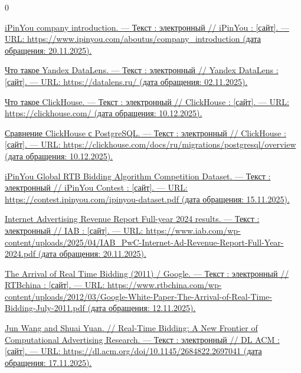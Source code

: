 \begin{thebibliography}{0}

\hypertarget{ipinyou}{}
\href{https://www.ipinyou.com/aboutus/company_introduction/}{iPinYou company introduction. — Текст : электронный // iPinYou : [сайт]. — URL: https://www.ipinyou.com/aboutus/company\_introduction (дата обращения: 20.11.2025).}

\hypertarget{datalens}{}
\href{https://datalens.ru/}{Что такое Yandex DataLens. — Текст : электронный // Yandex DataLens : [сайт]. — URL: https://datalens.ru/ (дата обращения: 02.11.2025).}

\hypertarget{clickhouse}{}
\href{https://clickhouse.com/}{Что такое ClickHouse. — Текст : электронный // ClickHouse : [сайт]. — URL: https://clickhouse.com/ (дата обращения: 10.12.2025).}

\hypertarget{clickhouse-vs-postgres}{}
\href{https://clickhouse.com/docs/ru/migrations/postgresql/overview}{Сравнение ClickHouse с PostgreSQL. — Текст : электронный // ClickHouse : [сайт]. — URL: https://clickhouse.com/docs/ru/migrations/postgresql/overview (дата обращения: 10.12.2025).}

\hypertarget{ipinyou-contest-database}{}
\href{https://contest.ipinyou.com/ipinyou-dataset.pdf}{iPinYou Global RTB Bidding Algorithm Competition Dataset. — Текст : электронный // iPinYou Contest : [сайт]. — URL: https://contest.ipinyou.com/ipinyou-dataset.pdf (дата обращения: 15.11.2025).}

\hypertarget{rtb-growth}{}
\href{https://www.iab.com/wp-content/uploads/2025/04/IAB_PwC-Internet-Ad-Revenue-Report-Full-Year-2024.pdf}{
Internet Advertising Revenue Report Full-year 2024 results. — Текст : электронный // IAB : [сайт]. — URL: https://www.iab.com/wp-content/uploads/2025/04/IAB\_PwC-Internet-Ad-Revenue-Report-Full-Year-2024.pdf (дата обращения: 20.11.2025).}

\hypertarget{arrival-of-rtb}{}
\href{https://www.rtbchina.com/wp-content/uploads/2012/03/Google-White-Paper-The-Arrival-of-Real-Time-Bidding-July-2011.pdf}{
The Arrival of Real Time Bidding (2011) / Google. — Текст : электронный // RTBchina : [сайт]. — URL: https://www.rtbchina.com/wp-content/uploads/2012/03/Google-White-Paper-The-Arrival-of-Real-Time-Bidding-July-2011.pdf (дата обращения: 12.11.2025).}

\hypertarget{rtb-research}{}
\href{https://dl.acm.org/doi/10.1145/2684822.2697041}{
Jun Wang and Shuai Yuan. // Real-Time Bidding: A New Frontier of Computational Advertising Research. — Текст : электронный // DL ACM : [сайт]. — URL: https://dl.acm.org/doi/10.1145/2684822.2697041 (дата обращения: 17.11.2025).}


\end{thebibliography}
